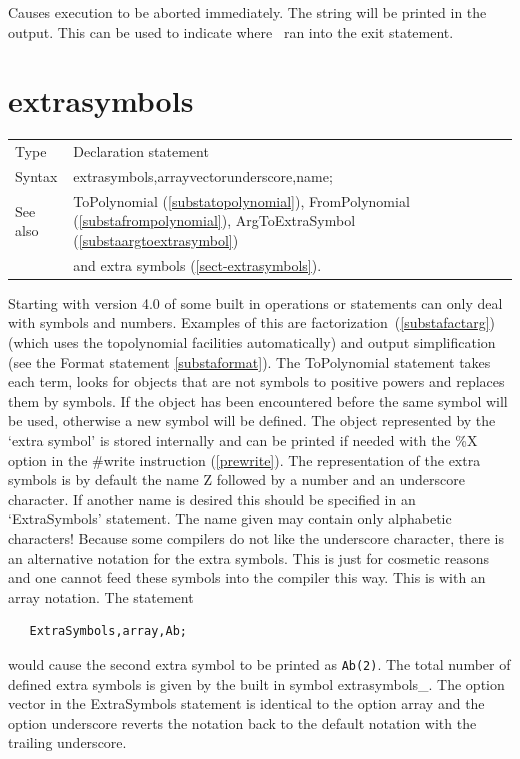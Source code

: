 \noindent Causes execution to be aborted 
immediately. The string will be printed in the output. This can be used to 
indicate where \FORM\ ran into the exit statement. \vspace{10mm}


\section{extrasymbols}
\label{substaextrasymbols}

\noindent \begin{tabular}{ll}
Type & Declaration statement\\
Syntax & extrasymbols,array\textbar{}vector\textbar{}underscore,name;
\\ See also & ToPolynomial (\ref{substatopolynomial}), FromPolynomial 
(\ref{substafrompolynomial}), ArgToExtraSymbol (\ref{substaargtoextrasymbol}) 
\\& and extra symbols 
(\ref{sect-extrasymbols}).
\end{tabular} \vspace{4mm}

\noindent Starting with version 4.0 of \FORM{} some built in operations or
statements can only deal with symbols and numbers. Examples of this are 
factorization~(\ref{substafactarg}) (which uses the topolynomial facilities 
automatically) and output simplification (see the Format 
statement \ref{substaformat}).
The ToPolynomial statement takes each term, looks for 
objects that are not symbols to positive powers and replaces them by 
symbols. If the object has been encountered before the same symbol will be 
used, otherwise a new symbol will be defined. The object represented by the 
`extra symbol' is stored internally and can be printed 
if needed with the \%X option in the \#write instruction (\ref{prewrite}). 
The representation of the extra symbols is by default the name Z followed 
by a number and an underscore character. If another name is desired this 
should be specified in an `ExtraSymbols' statement. The name given may 
contain only alphabetic characters! Because some compilers do not like the 
underscore character, there is an alternative notation for the extra 
symbols. This is just for cosmetic reasons and one cannot feed these 
symbols into the compiler this way. This is with an array notation. The 
statement
\begin{verbatim}
   ExtraSymbols,array,Ab;
\end{verbatim}
would cause the second extra symbol to be printed as {\tt Ab(2)}. The total 
number of defined extra symbols is given by the built in symbol 
extrasymbols\_.
The option vector in the ExtraSymbols statement is identical to the option 
array and the option underscore reverts the notation back to the default 
notation with the trailing underscore.
\vspace{10mm}

